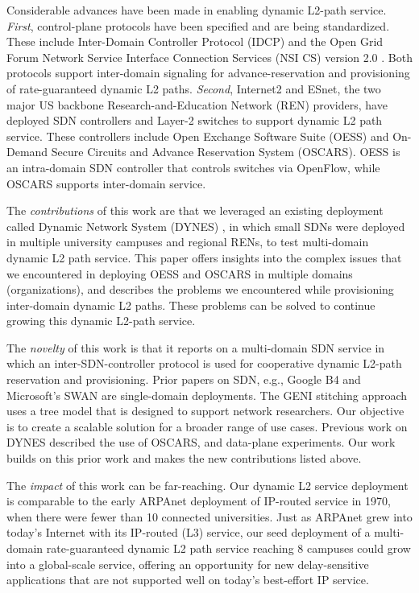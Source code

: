 Considerable advances have been made in enabling dynamic L2-path service.
\emph{First}, control-plane protocols have been specified and are being standardized. These
include Inter-Domain Controller Protocol (IDCP) \cite{IDCP} and the
Open Grid Forum Network Service Interface Connection Services (NSI CS) version 2.0 \cite{NSI}. Both protocols support
inter-domain signaling for advance-reservation and provisioning of rate-guaranteed
dynamic L2 paths. \emph{Second}, Internet2 and ESnet, the two major US backbone Research-and-Education
Network (REN) providers, have
deployed SDN controllers and Layer-2 switches to
support dynamic L2 path service. These controllers
include Open Exchange Software Suite (OESS)\cite{OESS} and
On-Demand Secure Circuits and Advance Reservation System (OSCARS)\cite{OSCARS}. OESS is an intra-domain
SDN controller that controls switches via OpenFlow, while
OSCARS supports inter-domain service.

The \emph{contributions} of this work are that we leveraged an existing deployment
called Dynamic Network System (DYNES) \cite{1742-6596-396-4-042065}, in which small SDNs were deployed
in multiple university campuses and regional RENs, to test multi-domain dynamic L2 path service. This paper
offers insights into the complex issues that we encountered in deploying OESS and OSCARS in multiple domains (organizations), and describes the problems we encountered while provisioning inter-domain dynamic L2 paths. These problems can be solved to continue growing this dynamic L2-path service.

The \emph{novelty} of this work is that it reports on a multi-domain SDN service in
which an inter-SDN-controller protocol is used for cooperative dynamic L2-path reservation and provisioning. Prior papers on SDN, e.g., Google B4  \cite{Jain:2013:BEG:2486001.2486019} and Microsoft's SWAN \cite{Hong:2013:AHU:2486001.2486012} are single-domain deployments. The GENI stitching approach
\cite{GENI-stitching} uses a tree model
that is designed to support network researchers. Our objective is to create
a scalable solution for a broader range of use cases. 
Previous work on DYNES \cite{1742-6596-396-4-042065} described the use of OSCARS, and data-plane experiments. Our work builds on this prior work and makes the new contributions listed above.

The \emph{impact} of this work can be far-reaching. Our dynamic L2 service deployment is comparable to the early ARPAnet deployment of IP-routed service in 1970, when there were fewer than 10 connected universities. Just as ARPAnet grew into today's Internet with its IP-routed (L3) service, our seed deployment of a multi-domain rate-guaranteed dynamic L2 path service reaching 8 campuses could grow into a global-scale service, offering an opportunity for new delay-sensitive applications that are not supported well on today's best-effort IP service.

